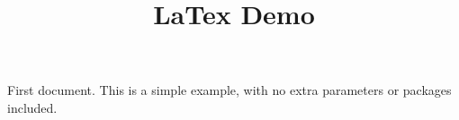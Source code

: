 \documentclass{article}
\title{LaTex Demo}
\begin{document}
First document. This is a simple example, with no 
extra parameters or packages included.
\end{document}
